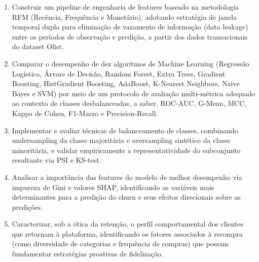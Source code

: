 \begin{enumerate}
	\item Construir um pipeline de engenharia de features baseado na metodologia RFM (Recência, Frequência e Monetário), adotando estratégia de janela temporal dupla para eliminação de vazamento de informação (data leakage) entre os períodos de observação e predição, a partir dos dados transacionais do dataset Olist.
	\item Comparar o desempenho de dez algoritmos de Machine Learning (Regressão Logística, Árvore de Decisão, Random Forest, Extra Trees, Gradient Boosting, HistGradient Boosting, AdaBoost, K-Nearest Neighbors, Naive Bayes e SVM) por meio de um protocolo de avaliação multi-métrica adequado ao contexto de classes desbalanceadas, a saber, ROC-AUC, G-Mean, MCC, Kappa de Cohen, F1-Macro e Precision-Recall.
	\item Implementar e avaliar técnicas de balanceamento de classes, combinando undersampling da classe majoritária e oversampling sintético da classe minoritária, e validar empiricamente a representatividade do subconjunto resultante via PSI e KS-test.
	\item Analisar a importância das features do modelo de melhor desempenho via impureza de Gini e valores SHAP, identificando as variáveis mais determinantes para a predição do churn e seus efeitos direcionais sobre as predições. \label{obj:importancia}
	\item Caracterizar, sob a ótica da retenção, o perfil comportamental dos clientes que retornam à plataforma, identificando os fatores associados à recompra (como diversidade de categorias e frequência de compras) que possam fundamentar estratégias proativas de fidelização.
\end{enumerate}

\FloatBarrier
